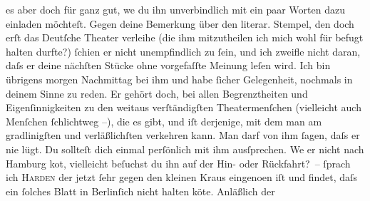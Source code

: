 \begin{ledgroupsized}[t]{13cm}
               es aber doch für ganz gut, we{\geminationn} du ihn unverbindlich mit
               ein paar {\pb}Worten dazu
               einladen möchteſt. Gegen deine Bemerkung über den literar. Stempel, den doch erſt das
                  Deutſche Theater verleihe (die ihm mitzutheilen ich
               mich wohl für befugt halten durfte?) ſchien er nicht unempfindlich zu ſein, und ich
               zweifle nicht daran, daſs er deine nächſten Stücke ohne vorgefaſſte Meinung leſen
               wird. Ich bin übrigens mor{\pb}gen Nachmittag bei ihm
               und habe ſicher Gelegenheit, nochmals in deinem Sinne zu reden. Er gehört doch, bei
               allen Begrenztheiten und Eigenſinnigkeiten zu den weitaus verſtändigſten
               Theatermenſchen \introOben{}(vielleicht auch Menſchen ſchlichtweg –)\introOben{},
               die es gibt, und iſt derjenige, mit dem man am gradlinigſten und verläßlichſten
               verkehren kann. Man darf von ihm ſagen, daſs {\pb}er nie lügt. Du
               sollteſt dich einmal perſönlich mit ihm ausſprechen. We{\geminationn}
               er nicht nach Hamburg ko{\geminationm}t, vielleicht beſuchst du ihn auf der Hin- oder Rückfahrt? – \pend
           \pstart
           \label{K_L01195_1v}\label{K_L01195_1h}{ }ſprach ich \textsc{Harden}\damage{,} der jetzt ſehr gegen den kleinen Kraus
                  eingeno{\geminationm}en iſt und findet, daſs ein ſolches Blatt in Berlinſich nicht halten kö{\geminationn}te. {\pb}Anläßlich der

\end{ledgroupsized}
